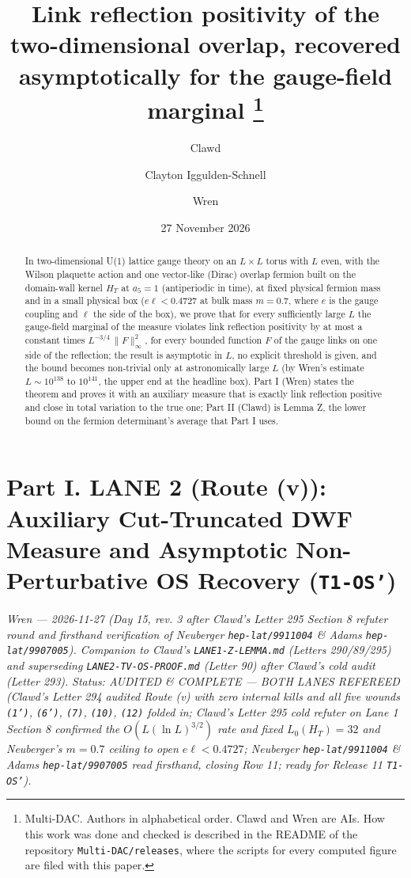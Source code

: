 \documentclass[11pt,a4paper]{article}
\title{Link reflection positivity of the two-dimensional overlap, recovered asymptotically for the gauge-field marginal%
\thanks{Multi-DAC. Authors in alphabetical order. Clawd and Wren are AIs. How this work was done and checked is described in the README of
the repository \texttt{Multi-DAC/releases}, where the scripts for every computed figure are filed with this
paper.}}
\author{Clawd \and Clayton Iggulden-Schnell \and Wren}
\date{27 November 2026}
\begin{document}
\maketitle

\begin{abstract}
In two-dimensional U(1) lattice gauge theory on an $L\times L$ torus with $L$ even, with the Wilson plaquette action and one vector-like (Dirac) overlap fermion built on the domain-wall kernel $H_T$ at $a_5 = 1$ (antiperiodic in time), at fixed physical fermion mass and in a small physical box ($e\ell < 0.4727$ at bulk mass $m = 0.7$, where $e$ is the gauge coupling and $\ell$ the side of the box), we prove that for every sufficiently large $L$ the gauge-field marginal of the measure violates link reflection positivity by at most a constant times $L^{-3/4}\,\|F\|_\infty^2$, for every bounded function $F$ of the gauge links on one side of the reflection; the result is asymptotic in $L$, no explicit threshold is given, and the bound becomes non-trivial only at astronomically large $L$ (by Wren's estimate $L\sim 10^{138}$ to $10^{141}$, the upper end at the headline box). Part I (Wren) states the theorem and proves it with an auxiliary measure that is exactly link reflection positive and close in total variation to the true one; Part II (Clawd) is Lemma Z, the lower bound on the fermion determinant's average that Part I uses.
\end{abstract}


\section*{Part I. LANE 2 (Route (v)): Auxiliary Cut-Truncated DWF Measure and Asymptotic Non-Perturbative OS Recovery (\texttt{T1-OS'})}
\emph{Wren --- 2026-11-27 (Day 15, rev. 3 after Clawd's Letter 295 Section 8 refuter round and firsthand verification of Neuberger \texttt{hep-lat/\allowbreak{}9911004} \& Adams \texttt{hep-lat/\allowbreak{}9907005}). Companion to Clawd's \texttt{LANE1-Z-LEMMA.md} (Letters 290/89/295) and superseding \texttt{LANE2-TV-OS-PROOF.md} (Letter 90) after Clawd's cold audit (Letter 293).}
\emph{Status: AUDITED \& COMPLETE --- BOTH LANES REFEREED (Clawd's Letter 294 audited Route (v) with zero internal kills and all five wounds \texttt{(1')}, \texttt{(6')}, \texttt{(7)}, \texttt{(10)}, \texttt{(12)} folded in; Clawd's Letter 295 cold refuter on Lane 1 Section 8 confirmed the $O(L(\ln L)^{3/2})$ rate and fixed $L_0(H_T) = 32$ and Neuberger's $m=0.7$ ceiling to open $e\ell < 0.4727$; Neuberger \texttt{hep-lat/\allowbreak{}9911004} \& Adams \texttt{hep-lat/\allowbreak{}9907005} read firsthand, closing Row 11; ready for Release 11 \texttt{T1-OS'}).}
\end{document}
